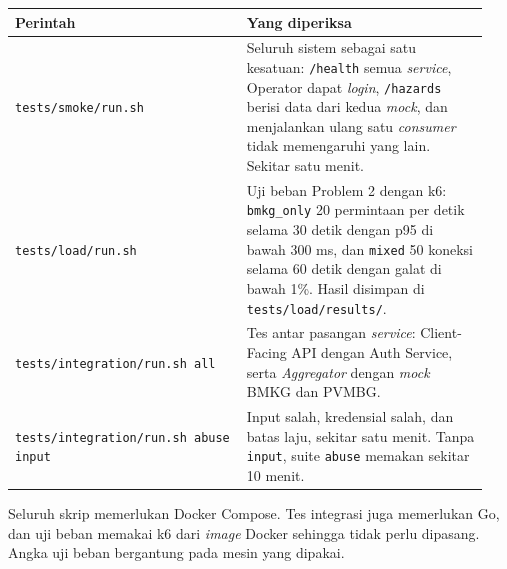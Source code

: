 \begin{longtable}[]{|>{\raggedright\arraybackslash}p{0.46\linewidth}|>{\raggedright\arraybackslash}p{0.48\linewidth}|}
\hline
\textbf{Perintah} & \textbf{Yang diperiksa} \\
\hline
\endhead
\texttt{tests/smoke/run.sh} & Seluruh sistem sebagai satu kesatuan: \texttt{/health} semua \textit{service}, Operator dapat \textit{login}, \texttt{/hazards} berisi data dari kedua \textit{mock}, dan menjalankan ulang satu \textit{consumer} tidak memengaruhi yang lain. Sekitar satu menit. \\
\hline
\texttt{tests/load/run.sh} & Uji beban Problem 2 dengan k6: \texttt{bmkg\_only} 20 permintaan per detik selama 30 detik dengan p95 di bawah 300 ms, dan \texttt{mixed} 50 koneksi selama 60 detik dengan galat di bawah 1\%. Hasil disimpan di \texttt{tests/load/results/}. \\
\hline
\texttt{tests/integration/run.sh all} & Tes antar pasangan \textit{service}: Client-Facing API dengan Auth Service, serta \textit{Aggregator} dengan \textit{mock} BMKG dan PVMBG. \\
\hline
\texttt{tests/integration/run.sh abuse input} & Input salah, kredensial salah, dan batas laju, sekitar satu menit. Tanpa \texttt{input}, suite \texttt{abuse} memakan sekitar 10 menit. \\
\hline
\end{longtable}

Seluruh skrip memerlukan Docker Compose. Tes integrasi juga memerlukan Go, dan uji beban memakai k6 dari \textit{image} Docker sehingga tidak perlu dipasang. Angka uji beban bergantung pada mesin yang dipakai.

